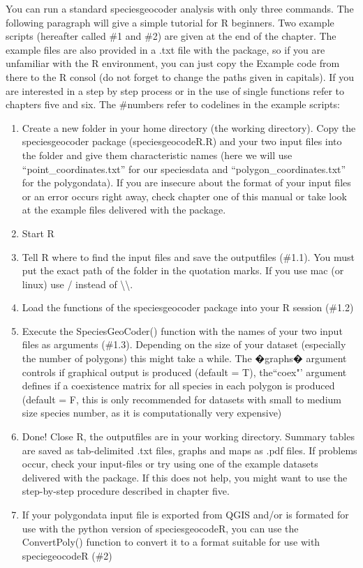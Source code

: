 \documentclass[a4paper,titlepage,11pt]{scrreprt}
\begin{document}
You can run a standard speciesgeocoder analysis with only three commands. The following paragraph will give a simple tutorial for R beginners. Two example scripts (hereafter called \#1 and \#2) are given at the end of the chapter. The example files are also provided in a .txt file with the package, so if you are unfamiliar with the R environment, you can just copy the Example code from there to the R consol (do not forget to change the paths given in capitals). If you are interested in a step by step process or in the use of single functions refer to chapters five and six. The \#numbers refer to codelines in the example scripts:

\begin{enumerate}

\item  Create a new folder in your home directory (the working directory). Copy the speciesgeocoder package (speciesgeocodeR.R) and your two input files into the folder and give them characteristic names (here we will use ``point\_coordinates.txt'' for our speciesdata and ``polygon\_coordinates.txt'' for the polygondata). If you are insecure about the format of your input files or an error occurs right away, check chapter one of this manual or take look at the example files delivered with the package.

\item Start R

\item Tell R where to find the input files and save the outputfiles (\#1.1). You must put the exact path of the folder in the quotation marks. If you use mac (or linux) use / instead of \textbackslash \textbackslash.

\item Load the functions of the speciesgeocoder package into your R session (\#1.2)

\item{Execute the SpeciesGeoCoder() function with the names of your two input files as arguments (\#1.3). Depending on the size of your dataset (especially the number of polygons) this might take a while. The �graphs� argument controls if graphical output is produced (default = T), the``coex"' argument defines if a coexistence matrix for all species in each polygon is produced (default = F, this is only recommended for datasets with small to medium size species number, as it is computationally very expensive)}

\item{Done! Close R, the outputfiles are in your working directory. Summary tables are saved as tab-delimited .txt files, graphs and maps as .pdf files. If problems occur, check your input-files or try using one of the example datasets delivered with the package. If this does not help, you might want to use the step-by-step procedure described in chapter five.}

\item{If your polygondata input file is exported from QGIS and/or is formated for use with the python version of speciesgeocodeR, you can use the ConvertPoly() function to convert it to a format suitable for use with speciegeocodeR (\#2)}

\end{enumerate}
\end{document}
